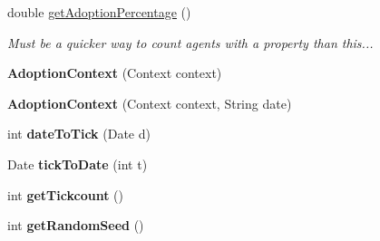 \begin{DoxyCompactItemize}
\item 
double \hyperlink{classuk_1_1ac_1_1dmu_1_1iesd_1_1cascade_1_1context_1_1_adoption_context_a74f24b05bf116eb21dfaca568f2210f0}{get\-Adoption\-Percentage} ()
\begin{DoxyCompactList}\small\item\em Must be a quicker way to count agents with a property than this... \end{DoxyCompactList}\item 
\hypertarget{classuk_1_1ac_1_1dmu_1_1iesd_1_1cascade_1_1context_1_1_adoption_context_ac75a060dd25f7480fdd03534d17d1de8}{{\bfseries Adoption\-Context} (Context context)}\label{classuk_1_1ac_1_1dmu_1_1iesd_1_1cascade_1_1context_1_1_adoption_context_ac75a060dd25f7480fdd03534d17d1de8}

\item 
\hypertarget{classuk_1_1ac_1_1dmu_1_1iesd_1_1cascade_1_1context_1_1_adoption_context_a50881c5756a65d2ee83c5acc42f0c955}{{\bfseries Adoption\-Context} (Context context, String date)}\label{classuk_1_1ac_1_1dmu_1_1iesd_1_1cascade_1_1context_1_1_adoption_context_a50881c5756a65d2ee83c5acc42f0c955}

\item 
\hypertarget{classuk_1_1ac_1_1dmu_1_1iesd_1_1cascade_1_1context_1_1_adoption_context_a3499e0309d29a8cb6b58694dfbd85b1f}{int {\bfseries date\-To\-Tick} (Date d)}\label{classuk_1_1ac_1_1dmu_1_1iesd_1_1cascade_1_1context_1_1_adoption_context_a3499e0309d29a8cb6b58694dfbd85b1f}

\item 
\hypertarget{classuk_1_1ac_1_1dmu_1_1iesd_1_1cascade_1_1context_1_1_adoption_context_a26914ecfbf56f2379619d5b3b94f7a61}{Date {\bfseries tick\-To\-Date} (int t)}\label{classuk_1_1ac_1_1dmu_1_1iesd_1_1cascade_1_1context_1_1_adoption_context_a26914ecfbf56f2379619d5b3b94f7a61}

\item 
\hypertarget{classuk_1_1ac_1_1dmu_1_1iesd_1_1cascade_1_1context_1_1_adoption_context_aa5419e40783a0a7d3733713db4ffc500}{int {\bfseries get\-Tickcount} ()}\label{classuk_1_1ac_1_1dmu_1_1iesd_1_1cascade_1_1context_1_1_adoption_context_aa5419e40783a0a7d3733713db4ffc500}

\item 
\hypertarget{classuk_1_1ac_1_1dmu_1_1iesd_1_1cascade_1_1context_1_1_adoption_context_acf72323c18f07c4e324b20de8675dd44}{int {\bfseries get\-Random\-Seed} ()}\label{classuk_1_1ac_1_1dmu_1_1iesd_1_1cascade_1_1context_1_1_adoption_context_acf72323c18f07c4e324b20de8675dd44}


\end{DoxyCompactItemize}
